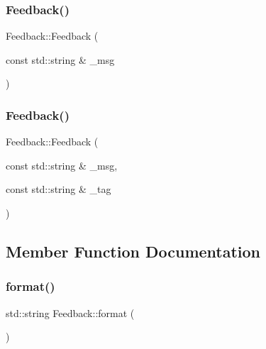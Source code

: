 \hypertarget{class_feedback_ad479227db3f800f497f287a4f550daa1}{}\label{class_feedback_ad479227db3f800f497f287a4f550daa1} 
\subsubsection{\texorpdfstring{Feedback()}{Feedback()}\hspace{0.1cm}{\footnotesize\ttfamily [2/3]}}
{\footnotesize\ttfamily Feedback\+::\+Feedback (\begin{DoxyParamCaption}\item[{const std\+::string \&}]{\+\_\+msg }\end{DoxyParamCaption})\hspace{0.3cm}{\ttfamily [inline]}}

\hypertarget{class_feedback_a6e2ac37abb3f6679b36a8ad037985c36}{}\label{class_feedback_a6e2ac37abb3f6679b36a8ad037985c36} 
\subsubsection{\texorpdfstring{Feedback()}{Feedback()}\hspace{0.1cm}{\footnotesize\ttfamily [3/3]}}
{\footnotesize\ttfamily Feedback\+::\+Feedback (\begin{DoxyParamCaption}\item[{const std\+::string \&}]{\+\_\+msg,  }\item[{const std\+::string \&}]{\+\_\+tag }\end{DoxyParamCaption})\hspace{0.3cm}{\ttfamily [inline]}}



\subsection{Member Function Documentation}
\hypertarget{class_feedback_a0b03ebf0611fe0d7e0595c50a64739e7}{}\label{class_feedback_a0b03ebf0611fe0d7e0595c50a64739e7} 
\subsubsection{\texorpdfstring{format()}{format()}}
{\footnotesize\ttfamily std\+::string Feedback\+::format (\begin{DoxyParamCaption}{ }\end{DoxyParamCaption})}




